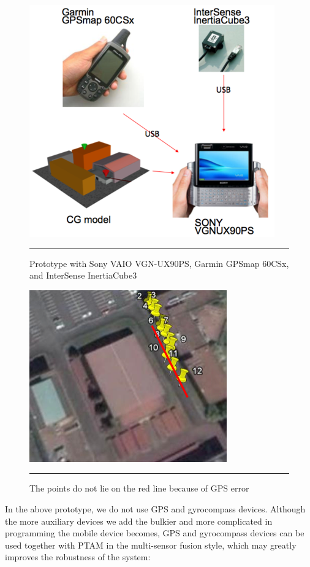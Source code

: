 \begin{figure}[htbp]
	\centering
	\includegraphics{./Primitives/vaio_gps_gyro.png}
	\rule{35em}{0.5pt}
	\caption[Prototype with GPS and gyrocompass devices]{Prototype with Sony VAIO VGN-UX90PS, Garmin GPSmap 60CSx, and InterSense InertiaCube3}
	\label{fig:VAIOGPSGyro}
\end{figure}

\begin{figure}[htbp]
	\centering
	\includegraphics{./Primitives/gps_error.png}
	\rule{35em}{0.5pt}
	\caption[GPS error]{The points do not lie on the red line because of GPS error}
	\label{fig:GPSError}
\end{figure}

In the above prototype, we do not use GPS and gyrocompass devices. Although the more auxiliary devices we add the bulkier and more complicated in programming the mobile device becomes, GPS and gyrocompass devices can be used together with PTAM in the multi-sensor fusion \citep{Reference14} style, which may greatly improves the robustness of the system:


